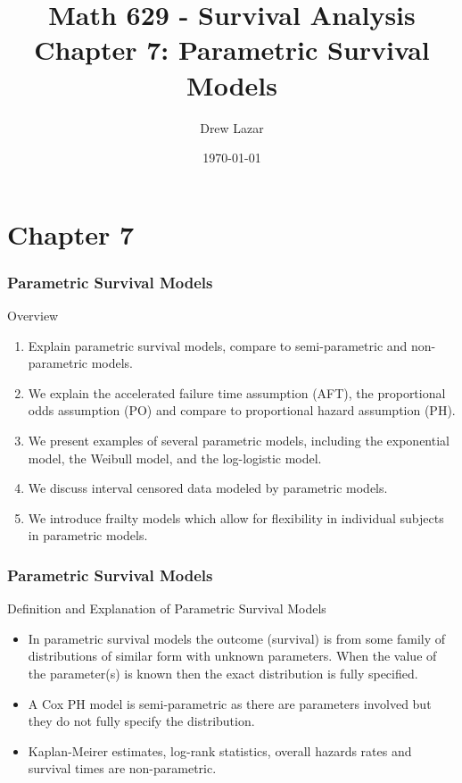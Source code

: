 \documentclass{beamer}
\title{Math 629 - Survival Analysis \\ Chapter 7: Parametric Survival Models
}
\author{Drew Lazar}
\institute{Ball State University}
\date{\today}
\theoremstyle{definition}
\begin{document}
\begin{frame}
    \titlepage
\end{frame}



\section{Chapter 7}
\begin{frame}
\frametitle{Parametric Survival Models}
\begin{block}{Overview}
\begin{enumerate}
\item Explain parametric survival models, compare to semi-parametric and non-parametric models.
\item We explain the accelerated failure time assumption (AFT), the proportional odds assumption (PO) and compare to proportional hazard assumption (PH).
\item We present examples of several parametric models, including the exponential model, the Weibull model, and the
log-logistic model.
\item We discuss interval censored data modeled by parametric models.
\item We introduce frailty models which allow for flexibility in individual subjects in parametric models.
\end{enumerate}
\end{block}
\end{frame}

\begin{frame}
\frametitle{Parametric Survival Models}
\begin{block}{Definition and Explanation of Parametric Survival Models}
\begin{itemize}
\item In parametric survival models the outcome (survival) is from some family of
distributions of similar form with unknown parameters. When the value of the parameter(s) is known then the exact distribution
is fully specified.
\item A Cox PH model is semi-parametric as there are parameters involved but they do not fully specify the distribution.
\item Kaplan-Meirer estimates, log-rank statistics, overall hazards rates and survival times are non-parametric.
\end{itemize}
\end{block}
\end{frame}
\end{document}
